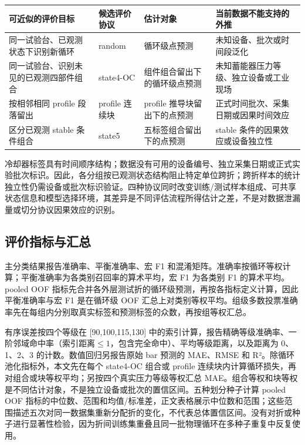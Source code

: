\documentclass[UTF8,12pt,a4paper]{ctexart}
\newcommand{\toprule}{\hline}
\newcommand{\midrule}{\hline}
\newcommand{\bottomrule}{\hline}
\begin{document}
\begin{table}[H]
\centering
\small
\begin{tabularx}{\linewidth}{>{\raggedright\arraybackslash}X >{\raggedright\arraybackslash}X >{\raggedright\arraybackslash}X >{\raggedright\arraybackslash}X}
\toprule
可近似的评价目标 & 候选评价协议 & 估计对象 & 当前数据不能支持的外推 \\
\midrule
同一试验台、已观测状态下识别新循环 & random & 循环级点预测 & 未知设备、批次或时间段泛化 \\
同一试验台、识别未见的已观测四部件组合 & state4-OC & 组件组合留出下的循环级点预测 & 未知蓄能器压力等级、独立设备或工业现场 \\
按相邻相同 profile 段落留出 & profile 连续块 & profile 推导块留出下的点预测 & 正式时间批次、采集日期或因果时间效应 \\
区分已观测 stable 条件组合 & state5 & 五标签组合留出下的点预测 & stable 条件的因果效应或设备独立性 \\
\bottomrule
\end{tabularx}
\end{table}
冷却器标签具有时间顺序结构；数据没有可用的设备编号、独立采集日期或正式实验批次标识。因此，各分组按已观测状态结构阻止特定单位跨折；跨折样本的统计独立性仍需设备或批次标识验证。四种协议同时改变训练/测试样本组成、可共享状态信息和模型选择环境，其差异是不同评估流程所得估计之差，不是对数据泄漏量或切分协议因果效应的识别。

\subsection{评价指标与汇总}
主分类结果报告准确率、平衡准确率、宏 F1 和混淆矩阵。准确率按循环等权计算；平衡准确率为各类别召回率的算术平均，宏 F1 为各类别 F1 的算术平均。pooled OOF 指标先合并各外层测试折的循环级预测，再按各指标定义计算，因此平衡准确率与宏 F1 是在循环级 OOF 汇总上对类别等权平均。组级多数投票准确率先在每组内分别取真实标签和预测标签的众数，再按组等权汇总。

有序误差按四个等级在 [90,100,115,130] 中的索引计算，报告精确等级准确率、一阶邻域命中率（索引距离$\leq 1$，包含完全命中）、平均等级距离，以及距离为 0、1、2、3 的计数。数值回归另报告原始 bar 预测的 MAE、RMSE 和 R²。除循环池化指标外，本文先在每个 state4-OC 组合或 profile 连续块内计算循环损失，再对组合或块等权平均；另按四个真实压力等级等权汇总 MAE。组合等权和块等权是不同估计对象，不是独立设备或批次的置信区间。五种划分种子计算 pooled OOF 指标的中位数、范围和均值/标准差，正文表格展示中位数和范围；这些范围描述五次对同一数据集重新分配折的变化，不代表总体置信区间。没有对折或种子进行显著性检验，因为折间训练集重叠且同一批物理循环在多种子重复中反复使用。
\end{document}
